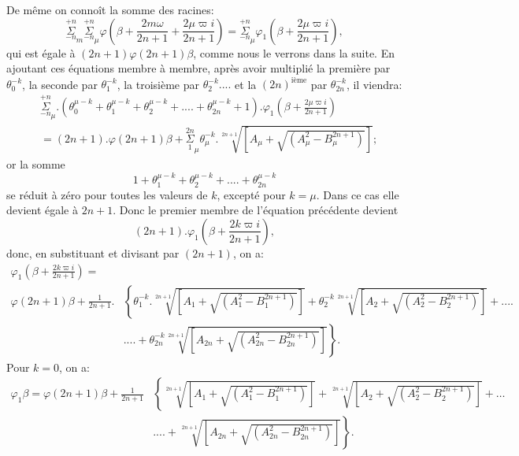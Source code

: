\documentclass{article}
\begin{document}
De même on connoît la somme des racines:
\[ \overset{+n}{\underset{-n}{\Sigma}}_{m}\overset{+n}{\underset{-n}{\Sigma}}_{\mu}\varphi\left(\beta+\frac{2m\omega}{2n+1}+\frac{2\mu\varpi i}{2n+1}\right)=\overset{+n}{\underset{-n}{\Sigma}}_{\mu}\varphi_{1}\left(\beta+\frac{2\mu\varpi i}{2n+1}\right), \]
qui est égale à $(2n+1)\varphi(2n+1)\beta$, comme nous le verrons dans la suite. En ajoutant ces équations membre à membre, après avoir multiplié la première par $\theta_{0}^{-k}$, la seconde par $\theta_{1}^{-k}$, la troisième par $\theta_{2}^{-k}....$ et la $(2n)^{\text{ième}}$ par $\theta_{2n}^{-k}$, il viendra:
\[ \begin{aligned}
&\overset{+n}{\underset{-n}{\Sigma}}_{\mu}.(\theta_{0}^{\mu-k}+\theta_{1}^{\mu-k}+\theta_{2}^{\mu-k}+....+\theta_{2n}^{\mu-k}+1).\varphi_{1}\left(\beta+\frac{2\mu\varpi i}{2n+1}\right)\\
&=(2n+1).\varphi(2n+1)\beta+\overset{2n}{\underset{1}{\Sigma}}_{\mu}\theta_{\mu}^{-k}.\sqrt[2n+1]{[A_{\mu}+\sqrt{(A_{\mu}^{2}-B_{\mu}^{2n+1})}]};
\end{aligned} \]
or la somme
\[ 1+\theta_{1}^{\mu-k}+\theta_{2}^{\mu-k}+....+\theta_{2n}^{\mu-k} \]
se réduit à zéro pour toutes les valeurs de $k$, excepté pour $k=\mu$. Dans ce cas elle devient égale à $2n+1$. Donc le premier membre de l'équation précédente devient
\[ (2n+1).\varphi_{1}\left(\beta+\frac{2k\varpi i}{2n+1}\right), \]
donc, en substituant et divisant par $(2n+1)$, on a:
\[ \begin{aligned}
\varphi_{1}\left(\beta+\frac{2k\varpi i}{2n+1}\right)=&\\
\varphi(2n+1)\beta+\frac{1}{2n+1}.&\left\{\theta_{1}^{-k}.\sqrt[2n+1]{[A_{1}+\sqrt{(A_{1}^{2}-B_{1}^{2n+1})}]}+\theta_{2}^{-k}\sqrt[2n+1]{[A_{2}+\sqrt{(A_{2}^{2}-B_{2}^{2n+1})}]}+....\right.\\
&\left.....+\theta_{2n}^{-k}\sqrt[2n+1]{[A_{2n}+\sqrt{(A_{2n}^{2}-B_{2n}^{2n+1})}]}\right\}.
\end{aligned} \tag{76.} \]
Pour $k=0$, on a:
\[ \begin{aligned}
\varphi_{1}\beta=\varphi(2n+1)\beta+\frac{1}{2n+1}&\left\{\sqrt[2n+1]{[A_{1}+\sqrt{(A_{1}^{2}-B_{1}^{2n+1})}]}+\sqrt[2n+1]{[A_{2}+\sqrt{(A_{2}^{2}-B_{2}^{2n+1})}]}+\ldots\right.\\
&\left.....+\sqrt[2n+1]{[A_{2n}+\sqrt{(A_{2n}^{2}-B_{2n}^{2n+1})}]}\right\}.
\end{aligned} \tag{77.} \]
\end{document}
